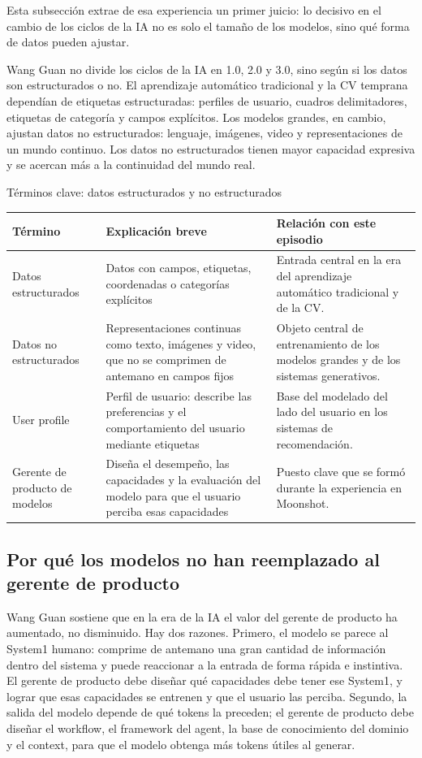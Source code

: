 Esta subsección extrae de esa experiencia un primer juicio: lo decisivo en el cambio de los ciclos de la IA no es solo el tamaño de los modelos, sino qué forma de datos pueden ajustar.

Wang Guan no divide los ciclos de la IA en 1.0, 2.0 y 3.0, sino según si los datos son estructurados o no. El aprendizaje automático tradicional y la CV temprana dependían de etiquetas estructuradas: perfiles de usuario, cuadros delimitadores, etiquetas de categoría y campos explícitos. Los modelos grandes, en cambio, ajustan datos no estructurados: lenguaje, imágenes, video y representaciones de un mundo continuo. Los datos no estructurados tienen mayor capacidad expresiva y se acercan más a la continuidad del mundo real.

\begin{knowledgebox}{Términos clave: datos estructurados y no estructurados}
\begin{tabularx}{\textwidth}{p{}p{}X}
\toprule
Término & Explicación breve & Relación con este episodio \\
\midrule
Datos estructurados & Datos con campos, etiquetas, coordenadas o categorías explícitos & Entrada central en la era del aprendizaje automático tradicional y de la CV. \\
Datos no estructurados & Representaciones continuas como texto, imágenes y video, que no se comprimen de antemano en campos fijos & Objeto central de entrenamiento de los modelos grandes y de los sistemas generativos. \\
User profile & Perfil de usuario: describe las preferencias y el comportamiento del usuario mediante etiquetas & Base del modelado del lado del usuario en los sistemas de recomendación. \\
Gerente de producto de modelos & Diseña el desempeño, las capacidades y la evaluación del modelo para que el usuario perciba esas capacidades & Puesto clave que se formó durante la experiencia en Moonshot. \\
\bottomrule
\end{tabularx}
\end{knowledgebox}

\subsection{Por qué los modelos no han reemplazado al gerente de producto}

Wang Guan sostiene que en la era de la IA el valor del gerente de producto ha aumentado, no disminuido. Hay dos razones. Primero, el modelo se parece al System1 humano: comprime de antemano una gran cantidad de información dentro del sistema y puede reaccionar a la entrada de forma rápida e instintiva. El gerente de producto debe diseñar qué capacidades debe tener ese System1, y lograr que esas capacidades se entrenen y que el usuario las perciba. Segundo, la salida del modelo depende de qué tokens la preceden; el gerente de producto debe diseñar el workflow, el framework del agent, la base de conocimiento del dominio y el context, para que el modelo obtenga más tokens útiles al generar.

